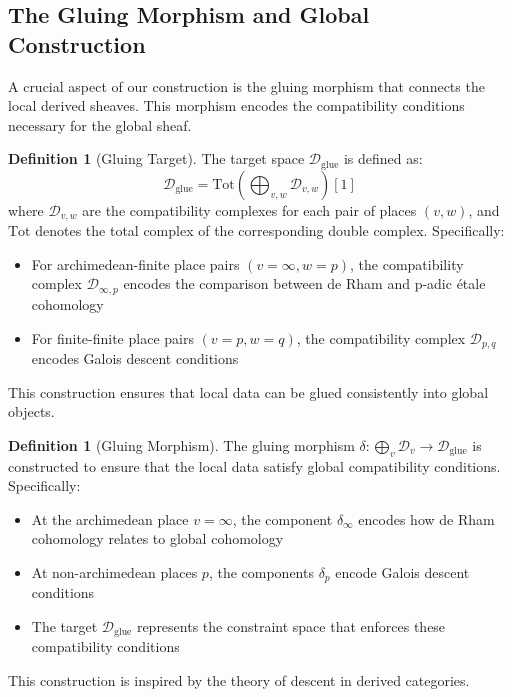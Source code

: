 \documentclass{article}
\theoremstyle{plain}
\theoremstyle{definition}
\newtheorem{definition}[theorem]{Definition}
\theoremstyle{remark}
\begin{document}
\subsection{The Gluing Morphism and Global Construction}

A crucial aspect of our construction is the gluing morphism that connects the local derived sheaves. This morphism encodes the compatibility conditions necessary for the global sheaf.

\begin{definition}[Gluing Target]
The target space $\mathcal{D}_{\text{glue}}$ is defined as:
\[
\mathcal{D}_{\text{glue}} = \text{Tot}\left(\bigoplus_{v,w} \mathcal{D}_{v,w}\right)[1]
\]
where $\mathcal{D}_{v,w}$ are the compatibility complexes for each pair of places $(v,w)$, and $\text{Tot}$ denotes the total complex of the corresponding double complex. Specifically:
\begin{itemize}
\item For archimedean-finite place pairs $(v=\infty, w=p)$, the compatibility complex $\mathcal{D}_{\infty,p}$ encodes the comparison between de Rham and p-adic étale cohomology
\item For finite-finite place pairs $(v=p, w=q)$, the compatibility complex $\mathcal{D}_{p,q}$ encodes Galois descent conditions
\end{itemize}
This construction ensures that local data can be glued consistently into global objects.
\end{definition}

\begin{definition}[Gluing Morphism]
The gluing morphism $\delta: \bigoplus_v \mathcal{D}_v \to \mathcal{D}_{\text{glue}}$ is constructed to ensure that the local data satisfy global compatibility conditions. Specifically:

\begin{itemize}
\item At the archimedean place $v = \infty$, the component $\delta_\infty$ encodes how de Rham cohomology relates to global cohomology
\item At non-archimedean places $p$, the components $\delta_p$ encode Galois descent conditions
\item The target $\mathcal{D}_{\text{glue}}$ represents the constraint space that enforces these compatibility conditions
\end{itemize}

This construction is inspired by the theory of descent in derived categories.
\end{definition}
\end{document}

